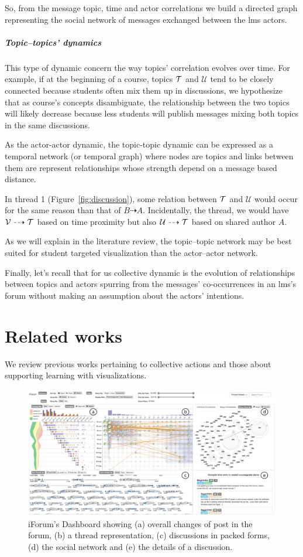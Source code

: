 \documentclass[a4paper,twoside]{article}
\newcommand{\V}{\mathcal{V}}
\newcommand{\U}{\mathcal{U}}
\begin{document}
So, from the message topic, time and actor correlations we build a directed graph representing the social network of messages exchanged between the \gls{lms} actors.

\subparagraph{Topic--topics' dynamics} This type of dynamic concern the way topics' correlation evolves over time.  For example, if at the beginning of a course, topics $\mathcal{T}$ and $\U$ tend to be closely connected because students often mix them up in discussions, we hypothesize that as course's concepts disambiguate, the relationship between the two topics will likely decrease because less students will publish messages mixing both topics in the same discussions.

As the actor-actor dynamic, the topic-topic dynamic can be expressed as a temporal network (or temporal graph) where nodes are topics and links between them are represent relationships whose strength depend on a message based distance.  %

In thread 1 (Figure~\ref{fig:discussion}), some relation between $\mathcal{T}$ and $\U$ would occur for the same reason than that of $B \dashrightarrow A$.  Incidentally, the  thread, we would have $\V  \dashrightarrow \T$ based on time proximity but also $\U \dashrightarrow \T$ based on shared author $A$.

As we will explain in the literature review, the topic--topic network may be best suited for student targeted visualization than the actor--actor network.


Finally, let's recall that for us collective dynamic is the evolution of relationships between topics and actors spurring from the messages' co-occurrences in an \gls{lms}'s forum without making an assumption about the actors' intentions.

\section{Related works}
\label{section:3}
We review previous works pertaining to collective actions and those about supporting learning with visualizations.


\begin{figure}[t]
  \small{
    \caption{\label{fig:fu}
      iForum's Dashboard \citep{Fu2017} showing (a) overall changes of post in the forum, (b) a thread representation, (c) discussions in packed forms, (d) the social network and (e) the details of a discussion.
    }}
  \centering
  \includegraphics[width=.5\textwidth]{images/fu.png}
\end{figure}
\end{document}
